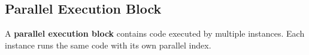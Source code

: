 \subsection*{Parallel Execution Block}

A \textbf{parallel execution block} contains code executed by multiple instances. Each instance runs the same code with its own parallel index.
